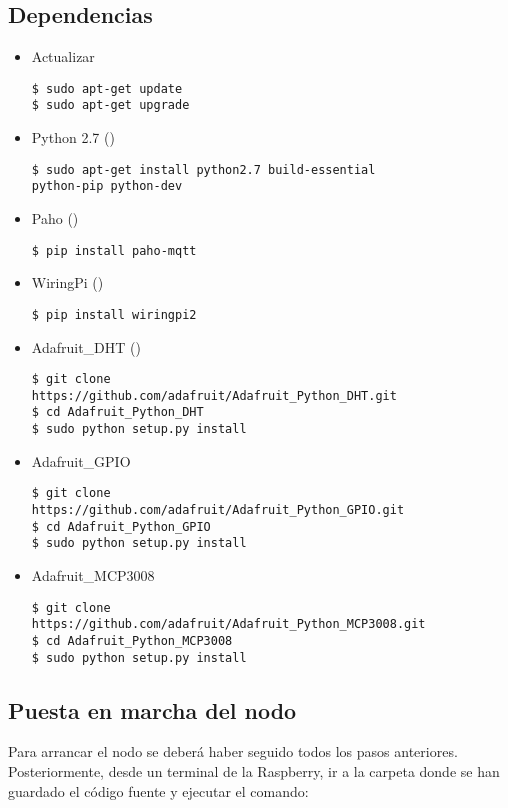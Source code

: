\subsection{Dependencias}
\label{makereference8.1.4}
	\begin{itemize}
		\item Actualizar
\lstset{language=bash}
\begin{lstlisting}[frame=single]
$ sudo apt-get update
$ sudo apt-get upgrade
\end{lstlisting}
		\item Python 2.7 (\cite{ARP:Python:2017})
\begin{lstlisting}[frame=single]
$ sudo apt-get install python2.7 build-essential 
python-pip python-dev
\end{lstlisting}
		\item Paho (\cite{ARP:Paho:2017})
\begin{lstlisting}[frame=single]
$ pip install paho-mqtt
\end{lstlisting}
		\item WiringPi (\cite{ARP:Wiring:2017})
\begin{lstlisting}[frame=single]
$ pip install wiringpi2
\end{lstlisting}
		\item Adafruit\_DHT (\cite{ARP:Adafruit:2017})
\begin{lstlisting}[frame=single]
$ git clone 
https://github.com/adafruit/Adafruit_Python_DHT.git
$ cd Adafruit_Python_DHT
$ sudo python setup.py install
\end{lstlisting}
		\item Adafruit\_GPIO
\begin{lstlisting}[frame=single]
$ git clone 
https://github.com/adafruit/Adafruit_Python_GPIO.git
$ cd Adafruit_Python_GPIO
$ sudo python setup.py install
\end{lstlisting}
		\item Adafruit\_MCP3008
\begin{lstlisting}[frame=single]
$ git clone 
https://github.com/adafruit/Adafruit_Python_MCP3008.git
$ cd Adafruit_Python_MCP3008
$ sudo python setup.py install
\end{lstlisting}
	\end{itemize}

\subsection{Puesta en marcha del nodo}
\label{makereference8.1.5}
Para arrancar el nodo se deberá haber seguido todos los pasos anteriores. Posteriormente, desde un terminal de la Raspberry, ir a la carpeta donde se han guardado el código fuente y ejecutar el comando: 

